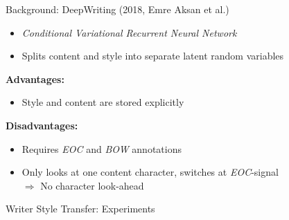 \documentclass[aspectratio=169]{beamer}
\begin{document}
\begin{frame}{Background: DeepWriting (2018, Emre Aksan et al.)}
\begin{itemize}
\item \emph{Conditional Variational Recurrent Neural Network}
\item Splits content and style into separate latent random variables
\end{itemize}

\vspace{1em}
\textbf{Advantages:}
\begin{itemize}
\item Style and content are stored explicitly
\end{itemize}

\vspace{1em}
\textbf{Disadvantages:}
\begin{itemize}
\item Requires \emph{EOC} and \emph{BOW} annotations
\item Only looks at one content character, switches at \emph{EOC}-signal\\$\Rightarrow$ No character look-ahead
\end{itemize}
\end{frame}




\begin{frame}{Writer Style Transfer: Experiments}
\begin{figure}[H]
  \vspace{-1em}
  \\
  \pause
  \hspace{1em}
  \pause
  \\
  \pause
\end{figure}
\end{frame}
\end{document}
